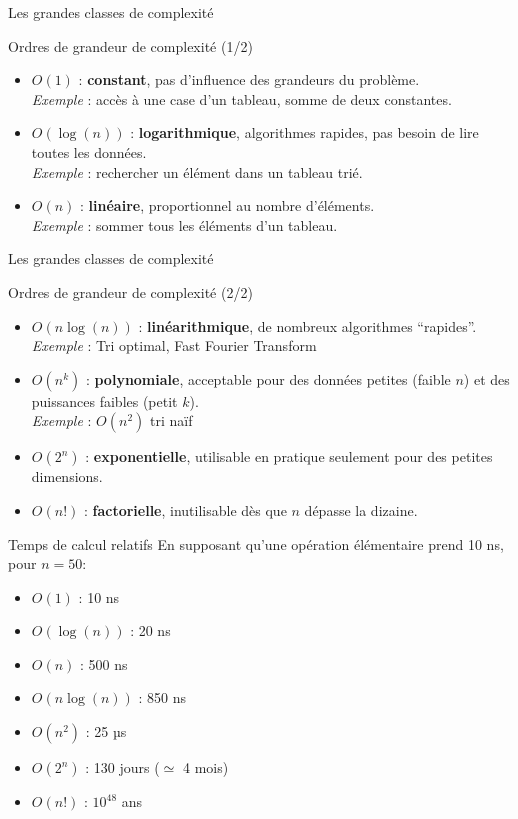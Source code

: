 \begin{frame}{Les grandes classes de complexité}
\begin{block}{Ordres de grandeur de complexité (1/2)}
\begin{itemize}
\item $O(1)$ : \textbf{constant}, pas d'influence des grandeurs du problème. \\
\textit{Exemple} : accès à une case d'un tableau, somme de deux constantes.
\item $O(\log(n))$ : \textbf{logarithmique}, algorithmes rapides, pas besoin de lire toutes les données.\\
\textit{Exemple} : rechercher un élément dans un tableau trié.
\item $O(n)$ : \textbf{linéaire}, proportionnel au nombre d'éléments.\\
\textit{Exemple} : sommer tous les éléments d'un tableau.
\end{itemize}
\end{block}
\end{frame}

\begin{frame}{Les grandes classes de complexité}
\begin{block}{Ordres de grandeur de complexité (2/2)}
\begin{itemize}
\item $O(n\log(n))$ : \textbf{linéarithmique}, de nombreux algorithmes ``rapides''.\\
\textit{Exemple} : Tri optimal, Fast Fourier Transform
\item $O(n^k)$ : \textbf{polynomiale}, acceptable pour des données petites (faible $n$) et des puissances faibles (petit $k$).\\
\textit{Exemple} : $O(n^2)$ tri naïf
\item $O(2^n)$ : \textbf{exponentielle}, utilisable en pratique seulement pour des petites dimensions.
\item $O(n!)$ : \textbf{factorielle}, inutilisable dès que $n$ dépasse la dizaine.
\end{itemize}
\end{block}
\end{frame}

\begin{frame}{Temps de calcul relatifs}
En supposant qu'une opération élémentaire prend 10 ns, pour $n = 50$:
\begin{itemize}
    \item $O(1)$ : 10 ns
    \item $O(\log(n))$ : 20 ns
    \item $O(n)$ : 500 ns
    \item $O(n\log(n))$ : 850 ns
    \item $O(n^{2})$ : 25 µs
    \item $O(2^n)$ : 130 jours ($\simeq$ 4 mois)
    \item $O(n!)$ : $10^{48}$ ans 
\end{itemize}
\end{frame}


